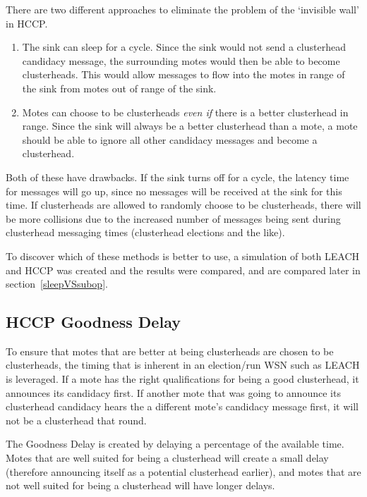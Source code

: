 There are two different approaches to eliminate the problem of the `invisible wall' in HCCP.
\begin{enumerate}
\item The sink can sleep for a cycle. Since the sink would not send a
clusterhead candidacy message, the surrounding motes would then 
be able to become clusterheads. This would allow messages to flow into the 
motes in range of the sink from motes out of range of the sink.
\item Motes can choose to be clusterheads \emph{even if} there is a better clusterhead in range.
Since the sink will always be a better clusterhead than a mote, a mote should 
be able to ignore all other candidacy messages and become a clusterhead.
\end{enumerate}


Both of these have drawbacks. If the sink turns off for a cycle, the latency time for messages
will go up, since no messages will be received at the sink for this time. If clusterheads
are allowed to randomly choose to be clusterheads, there will be more collisions
due to the increased number of messages being sent during clusterhead messaging times (clusterhead
elections and the like).

To discover which of these methods is better to  use, a simulation of both LEACH and HCCP 
was created and the results were compared, and are compared later in section~\ref{sleepVSsubop}.


\subsection{HCCP Goodness Delay}
\label{subsec:goodnessDelay}

To ensure that motes that are better at being clusterheads are chosen to be clusterheads, the timing that
is inherent in an election/run WSN such as LEACH is leveraged.  If a mote has the right qualifications
for being a good clusterhead, it announces its candidacy first. If another mote that was
going to announce its clusterhead candidacy hears the a different mote's candidacy message first,
it will not be a clusterhead that round. 

The Goodness Delay is created by delaying a percentage of the available time. 
Motes that are well suited for being a clusterhead will create a small delay (therefore
announcing itself as a potential clusterhead earlier), and motes that are not well suited for being 
a clusterhead will have longer delays.

